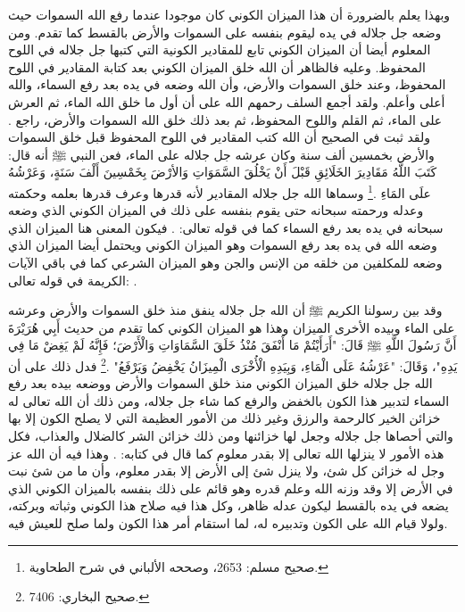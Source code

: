 وبهذا يعلم بالضرورة أن هذا الميزان الكوني كان موجودا عندما رفع الله السموات حيث وضعه جل جلاله في يده ليقوم بنفسه على السموات والأرض بالقسط كما تقدم. ومن المعلوم أيضا أن الميزان الكوني تابع للمقادير الكونية التي كتبها جل جلاله في اللوح المحفوظ. وعليه فالظاهر أن الله خلق الميزان الكوني بعد كتابة المقادير في اللوح المحفوظ، وعند خلق السموات والأرض، وأن الله وضعه في يده بعد رفع السماء، والله أعلى وأعلم. ولقد أجمع السلف رحمهم الله على أن أول ما خلق الله الماء، ثم العرش على الماء، ثم القلم واللوح المحفوظ، ثم بعد ذلك خلق الله السموات والأرض، راجع . ولقد ثبت في الصحيح أن الله كتب المقادير في اللوح المحفوظ قبل خلق السموات والأرض بخمسين ألف سنة وكان عرشه جل جلاله على الماء، فعن النبي ﷺ أنه قال:  كَتَبَ اللَّهُ مَقَادِيرَ الخَلَائِقِ قَبْلَ أَنْ يَخْلُقَ السَّمَوَاتِ وَالأرْضَ بِخَمْسِينَ أَلْفَ سَنَةٍ، وَعَرْشُهُ علَى المَاءِ \href{https://shamela.ws/book/1727/6683#p2}{\faExternalLink} \cite{muslim}.\footnote{صحيح مسلم: 2653، وصححه الألباني في شرح الطحاوية.} وسماها الله جل جلاله المقادير لأنه قدرها وعرف قدرها بعلمه وحكمته وعدله ورحمته سبحانه حتى يقوم بنفسه على ذلك في الميزان الكوني الذي وضعه سبحانه في يده بعد رفع السماء كما في قوله تعالى: 
\quranayah*[55][7]{\footnotesize \surahname*[55]}. فيكون المعنى هنا الميزان الذي وضعه الله في يده بعد رفع السموات وهو الميزان الكوني ويحتمل أيضا الميزان الذي وضعه للمكلفين من خلقه من الإنس والجن وهو الميزان الشرعي كما في باقي الآيات الكريمة في قوله تعالى: 
\quranayah*[55][8-9]{\footnotesize \surahname*[55]}. 

وقد بين رسولنا الكريم ﷺ أن الله جل جلاله ينفق منذ خلق السموات والأرض وعرشه على الماء وبيده الأخرى الميزان وهذا هو الميزان الكوني كما تقدم من حديث أَبِي هُرَيْرَةَ أَنَّ رَسُولَ اللَّهِ ﷺ قَالَ: "أَرَأَيْتُمْ مَا أَنْفَقَ مُنْذُ خَلَقَ السَّمَاوَاتِ وَالْأَرْضَ؛ فَإِنَّهُ لَمْ يَغِضْ مَا فِي يَدِهِ"، وَقَالَ: "عَرْشُهُ عَلَى الْمَاءِ، وَبِيَدِهِ الْأُخْرَى الْمِيزَانُ يَخْفِضُ وَيَرْفَعُ" \href{https://shamela.ws/book/1284/4620#p2}{\faExternalLink} \cite{bukhari}.\footnote{صحيح البخاري: 7406.} فدل ذلك على أن الله جل جلاله خلق الميزان الكوني منذ خلق السموات والأرض ووضعه بيده بعد رفع السماء لتدبير هذا الكون بالخفض والرفع كما شاء جل جلاله، ومن ذلك أن الله تعالى له خزائن الخير كالرحمة والرزق وغير ذلك من الأمور العظيمة التي لا يصلح الكون إلا بها والتي أحصاها جل جلاله وجعل لها خزائنها ومن ذلك خزائن الشر كالضلال والعذاب، فكل هذه الأمور لا ينزلها الله تعالى إلا بقدر معلوم كما قال في كتابه: 
\quranayah*[15][19-21]{\footnotesize \surahname*[15]}. وهذا فيه أن الله عز وجل له خزائن كل شئ، ولا ينزل شئ إلى الأرض إلا بقدر معلوم، وأن ما من شئ نبت في الأرض إلا وقد وزنه الله وعلم قدره وهو قائم على ذلك بنفسه بالميزان الكوني الذي يضعه في يده بالقسط ليكون عدله ظاهر، وكل هذا فيه صلاح هذا الكوني وثباته وبركته، ولولا قيام الله على الكون وتدبيره له، لما استقام أمر هذا الكون ولما صلح للعيش فيه.

